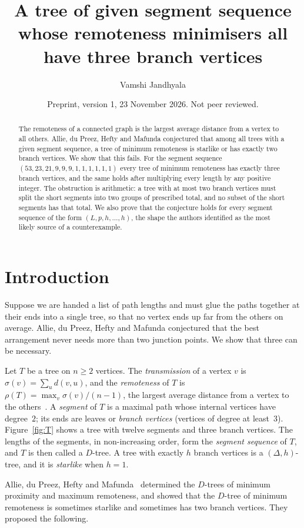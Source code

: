 \documentclass[11pt]{amsart}
\title[Remoteness minimisers with three branch vertices]{A tree of given segment sequence whose remoteness minimisers all have three branch vertices}
\author{Vamshi Jandhyala}
\date{Preprint, version 1, 23 November 2026. Not peer reviewed.}
\theoremstyle{definition}
\newcommand{\sig}{\sigma}
\begin{document}
\begin{abstract}
The remoteness of a connected graph is the largest average distance from a vertex to all others. Allie, du Preez,
Hefty and Mafunda conjectured that among all trees with a given segment sequence, a tree of minimum remoteness is
starlike or has exactly two branch vertices. We show that this fails. For the segment sequence
$(53,23,21,9,9,9,1,1,1,1,1,1)$ every tree of minimum remoteness has exactly three branch vertices, and the same holds
after multiplying every length by any positive integer. The obstruction is arithmetic: a tree with at most two branch
vertices must split the short segments into two groups of prescribed total, and no subset of the short segments has
that total. We also prove that the conjecture holds for every segment sequence of the form $(L,p,h,\dots,h)$, the shape
the authors identified as the most likely source of a counterexample.
\end{abstract}

\maketitle

\section{Introduction}

Suppose we are handed a list of path lengths and must glue the paths together at their ends into a single tree, so
that no vertex ends up far from the others on average. Allie, du Preez, Hefty and Mafunda conjectured that the best
arrangement never needs more than two junction points. We show that three can be necessary.

Let $T$ be a tree on $n\ge2$ vertices. The \emph{transmission} of a vertex $v$ is $\sig(v)=\sum_{u}d(v,u)$, and the
\emph{remoteness} of $T$ is $\rho(T)=\max_v \sig(v)/(n-1)$, the largest average distance from a vertex to the
others~\cite{AH}. A \emph{segment} of $T$ is a maximal path whose internal vertices have degree~$2$; its ends are
leaves or \emph{branch vertices} (vertices of degree at least~$3$). Figure~\ref{fig:T} shows a tree with twelve
segments and three branch vertices. The lengths of the segments, in non-increasing
order, form the \emph{segment sequence} of $T$, and $T$ is then called a $D$-tree. A tree with exactly $h$ branch
vertices is a $(\Delta,h)$-tree, and it is \emph{starlike} when $h=1$.

Allie, du Preez, Hefty and Mafunda~\cite{ADHM} determined the $D$-trees of minimum proximity and maximum remoteness,
and showed that the $D$-tree of minimum remoteness is sometimes starlike and sometimes has two branch vertices. They
proposed the following.
\end{document}
